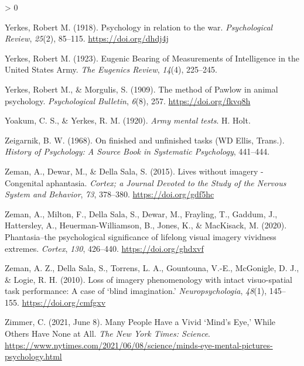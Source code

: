 \documentclass[
  oneside,
  12pt]{crumpbook}
\newlength{\cslhangindent}
\newenvironment{CSLReferences}[2] %
 {%
  \setlength{\parindent}{0pt}
  \ifodd #1 \everypar{\setlength{\hangindent}{\cslhangindent}}\ignorespaces\fi
  \ifnum #2 > 0
  \setlength{\parskip}{#2\baselineskip}
  \fi
 }%
 {}
\begin{document}
\begin{CSLReferences}{1}{0}
\leavevmode\hypertarget{ref-yerkesPsychologyRelationWar1918}{}%
Yerkes, Robert M. (1918). Psychology in relation to the war. \emph{Psychological Review}, \emph{25}(2), 85--115. \url{https://doi.org/dhdj4j}

\leavevmode\hypertarget{ref-yerkesEugenicBearingMeasurements1923}{}%
Yerkes, Robert M. (1923). Eugenic {Bearing} of {Measurements} of {Intelligence} in the {United States Army}. \emph{The Eugenics Review}, \emph{14}(4), 225--245.

\leavevmode\hypertarget{ref-yerkesMethodPawlowAnimal1909}{}%
Yerkes, Robert M., \& Morgulis, S. (1909). The method of {Pawlow} in animal psychology. \emph{Psychological Bulletin}, \emph{6}(8), 257. \url{https://doi.org/fkvq8h}

\leavevmode\hypertarget{ref-yoakumArmyMentalTests1920}{}%
Yoakum, C. S., \& Yerkes, R. M. (1920). \emph{Army mental tests}. {H. Holt}.

\leavevmode\hypertarget{ref-zeigarnikFinishedUnfinishedTasks1968}{}%
Zeigarnik, B. W. (1968). On finished and unfinished tasks ({WD Ellis}, {Trans}.). \emph{History of Psychology: A Source Book in Systematic Psychology}, 441--444.

\leavevmode\hypertarget{ref-zemanLivesImageryCongenital2015}{}%
Zeman, A., Dewar, M., \& Della Sala, S. (2015). Lives without imagery - {Congenital} aphantasia. \emph{Cortex; a Journal Devoted to the Study of the Nervous System and Behavior}, \emph{73}, 378--380. \url{https://doi.org/gdf5hc}

\leavevmode\hypertarget{ref-zemanPhantasiaPsychologicalSignificance2020}{}%
Zeman, A., Milton, F., Della Sala, S., Dewar, M., Frayling, T., Gaddum, J., Hattersley, A., Heuerman-Williamson, B., Jones, K., \& MacKisack, M. (2020). Phantasia--the psychological significance of lifelong visual imagery vividness extremes. \emph{Cortex}, \emph{130}, 426--440. \url{https://doi.org/ghdxvf}

\leavevmode\hypertarget{ref-zemanLossImageryPhenomenology2010}{}%
Zeman, A. Z., Della Sala, S., Torrens, L. A., Gountouna, V.-E., McGonigle, D. J., \& Logie, R. H. (2010). Loss of imagery phenomenology with intact visuo-spatial task performance: {A} case of {`blind imagination.'} \emph{Neuropsychologia}, \emph{48}(1), 145--155. \url{https://doi.org/cmfgxv}

\leavevmode\hypertarget{ref-zimmerManyPeopleHave2021}{}%
Zimmer, C. (2021, June 8). Many {People Have} a {Vivid} {`{Mind}'s {Eye},'} {While Others Have None} at {All}. \emph{The New York Times: Science}. \url{https://www.nytimes.com/2021/06/08/science/minds-eye-mental-pictures-psychology.html}

\end{CSLReferences}
\end{document}
